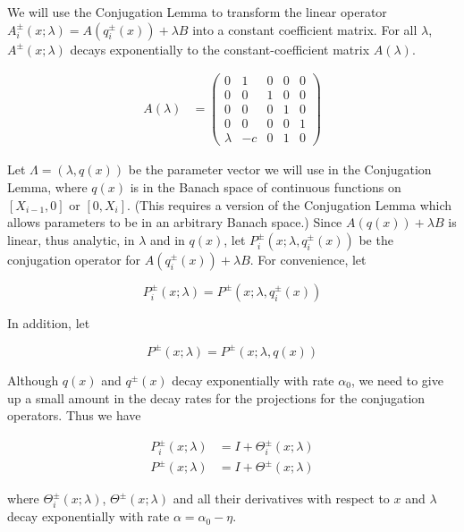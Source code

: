 \documentclass[12pt]{article}
\begin{document}
We will use the Conjugation Lemma to transform the linear operator $A_i^\pm(x; \lambda) = A( q_i^\pm(x) ) + \lambda B$ into a constant coefficient matrix. For all $\lambda$, $A^\pm(x; \lambda)$ decays exponentially to the constant-coefficient matrix $A(\lambda)$. 

\begin{align}\label{Alambda}
A(\lambda) &= \begin{pmatrix}0 & 1 & 0 & 0 & 0 \\0 & 0 & 1 & 0 & 0 \\0 & 0 & 0 & 1 & 0 \\0 & 0 & 0 & 0 & 1 \\
\lambda & -c & 0 & 1 & 0 \end{pmatrix}
\end{align}

Let $\Lambda = (\lambda, q(x))$ be the parameter vector we will use in the Conjugation Lemma, where $q(x)$ is in the Banach space of continuous functions on $[X_{i-1}, 0]$ or $[0, X_i]$. (This requires a version of the Conjugation Lemma which allows parameters to be in an arbitrary Banach space.) Since $A( q(x) ) + \lambda B$ is linear, thus analytic, in $\lambda$ and in $q(x)$, let $P_i^\pm(x; \lambda, q_i^\pm(x) )$ be the conjugation operator for $A( q_i^\pm(x) ) + \lambda B$. For convenience, let  

\begin{equation}
P_i^\pm(x; \lambda) = P^\pm(x; \lambda, q_i^\pm(x) )
\end{equation}

In addition, let 

\begin{equation}
P^\pm(x; \lambda) = P^\pm(x; \lambda, q(x) )
\end{equation}

Although $q(x)$ and $q^\pm(x)$ decay exponentially with rate $\alpha_0$, we need to give up a small amount in the decay rates for the projections for the conjugation operators. Thus we have

\begin{align*}
P_i^\pm(x; \lambda) &= I + \Theta_i^\pm(x; \lambda)  \\
P^\pm(x; \lambda) &= I + \Theta^\pm(x; \lambda)
\end{align*}

where $\Theta_i^\pm(x; \lambda)$, $\Theta^\pm(x; \lambda)$ and all their derivatives with respect to $x$ and $\lambda$ decay exponentially with rate $\alpha = \alpha_0 - \eta$.\\
\end{document}
